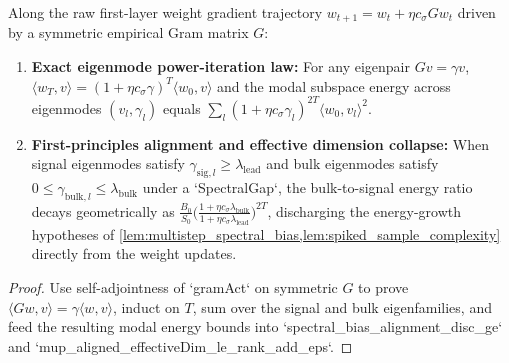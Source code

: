 \begin{lemma}\label{lem:gradient_spectral_emergence}
\leanok
{}
Along the raw first-layer weight gradient trajectory $w_{t+1} = w_t + \eta c_\sigma G w_t$ driven by a symmetric empirical Gram matrix $G$:
\begin{enumerate}
\item \textbf{Exact eigenmode power-iteration law:} For any eigenpair $G v = \gamma v$, $\langle w_T, v\rangle = (1 + \eta c_\sigma\gamma)^T \langle w_0, v\rangle$ and the modal subspace energy across eigenmodes $(v_l, \gamma_l)$ equals $\sum_l (1 + \eta c_\sigma\gamma_l)^{2T}\langle w_0, v_l\rangle^2$.
\item \textbf{First-principles alignment and effective dimension collapse:} When signal eigenmodes satisfy $\gamma_{\mathrm{sig},l} \ge \lambda_{\mathrm{lead}}$ and bulk eigenmodes satisfy $0 \le \gamma_{\mathrm{bulk},l} \le \lambda_{\mathrm{bulk}}$ under a `SpectralGap`, the bulk-to-signal energy ratio decays geometrically as $\frac{B_0}{S_0}\bigl(\frac{1+\eta c_\sigma\lambda_{\mathrm{bulk}}}{1+\eta c_\sigma\lambda_{\mathrm{lead}}}\bigr)^{2T}$, discharging the energy-growth hypotheses of \cref{lem:multistep_spectral_bias,lem:spiked_sample_complexity} directly from the weight updates.
\end{enumerate}
\end{lemma}
\begin{proof}
\leanok
Use self-adjointness of `gramAct` on symmetric $G$ to prove $\langle G w, v\rangle = \gamma\langle w, v\rangle$, induct on $T$, sum over the signal and bulk eigenfamilies, and feed the resulting modal energy bounds into `spectral_bias_alignment_disc_ge` and `mup_aligned_effectiveDim_le_rank_add_eps`.
\end{proof}

